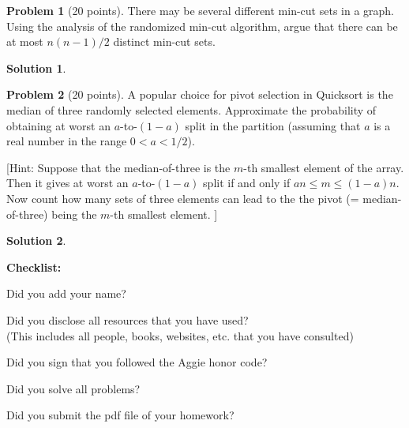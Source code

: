 \documentclass{article}
\theoremstyle{definition}
\newtheorem{problem}{Problem}
\newtheorem*{solution}{Solution}
\newcommand{\checklist}{\noindent\textbf{Checklist:}
\begin{compactitem}[$\Box$] 
\item Did you add your name? 
\item Did you disclose all resources that you have used? \\
(This includes all people, books, websites, etc. that you have consulted)
\item Did you sign that you followed the Aggie honor code? 
\item Did you solve all problems? 
\item Did you submit the pdf file
  of your homework?
\end{compactitem}
}
\begin{document}
\begin{problem}[20 points] 
  There may be several different min-cut sets in a graph. Using the
  analysis of the randomized min-cut algorithm, argue that there can
  be at most $n(n - 1)/2$ distinct min-cut sets.
\end{problem}
\begin{solution}
\end{solution}

\begin{problem}[20 points] 
A popular choice for pivot selection in Quicksort is the median of
three randomly selected elements. Approximate the probability of
obtaining at worst an $a$-to-$(1-a)$ split in the partition (assuming
that $a$ is a real number in the range $0<a<1/2$). 

\noindent{}[Hint: Suppose that the median-of-three is the $m$-th smallest element
of the array. Then it gives at worst an $a$-to-$(1-a)$ split if and
only if $an \le m\le (1-a)n$. Now count how
many sets of three elements can lead to the the pivot
(= median-of-three) being the $m$-th smallest element. ]

\end{problem}
\begin{solution}
\end{solution}









\goodbreak
\checklist
\end{document}
